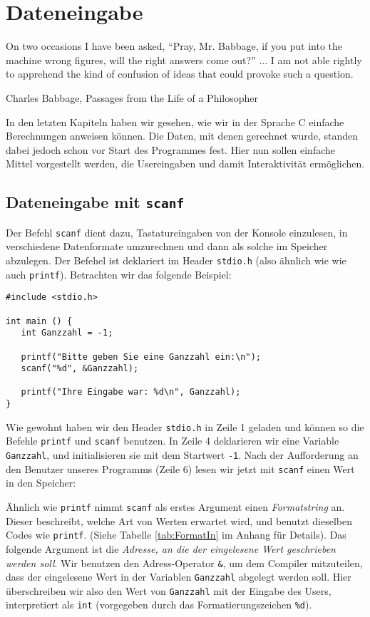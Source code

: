 \chapter{Dateneingabe} \label{chp:Input}
\epigraph{On two occasions I have been asked, \enquote{Pray, Mr. Babbage, if you put into the machine wrong figures, will the right answers come out?} ... I am not able rightly to apprehend the kind of confusion of ideas that could provoke such a question.}{Charles Babbage, Passages from the Life of a Philosopher}

In den letzten Kapiteln haben wir gesehen, wie wir in der Sprache C einfache Berechnungen anweisen können. Die Daten, mit denen gerechnet wurde, standen dabei jedoch schon vor Start des Programmes fest. Hier nun sollen einfache Mittel vorgestellt werden, die Usereingaben und damit Interaktivität ermöglichen.

\section{Dateneingabe mit \texttt{scanf}}
Der Befehl \texttt{scanf} dient dazu, Tastatureingaben von der Konsole einzulesen, in verschiedene Datenformate umzurechnen und dann als solche im Speicher abzulegen. Der Befehel ist deklariert im Header \texttt{stdio.h} (also ähnlich wie wie auch \texttt{printf}). Betrachten wir das folgende Beispiel:

\begin{codebox}
\begin{verbatim}
#include <stdio.h>

int main () {
   int Ganzzahl = -1;
   
   printf("Bitte geben Sie eine Ganzzahl ein:\n");
   scanf("%d", &Ganzzahl);
   
   printf("Ihre Eingabe war: %d\n", Ganzzahl);
}
\end{verbatim}
\end{codebox}

Wie gewohnt haben wir den Header \texttt{stdio.h} in Zeile 1 geladen und können so die Befehle \texttt{printf} und \texttt{scanf} benutzen. In Zeile 4 deklarieren wir eine Variable \texttt{Ganzzahl}, und initialisieren sie mit dem Startwert \texttt{-1}. Nach der Aufforderung an den Benutzer unseres Programms (Zeile 6) lesen wir jetzt mit \texttt{scanf} einen Wert in den Speicher:

Ähnlich wie \texttt{printf} nimmt \texttt{scanf} als erstes Argument einen \emph{Formatstring} an. Dieser beschreibt, welche Art von Werten erwartet wird, und benutzt dieselben Codes wie \texttt{printf}. (Siehe Tabelle \ref{tab:FormatIn} im Anhang für Details). Das folgende Argument ist die \emph{Adresse, an die der eingelesene Wert geschrieben werden soll}. Wir benutzen den Adress-Operator \texttt{\&}, um dem Compiler mitzuteilen, dass der eingelesene Wert in der Variablen \texttt{Ganzzahl} abgelegt werden soll. Hier überschreiben wir also den Wert von \texttt{Ganzzahl} mit der Eingabe des Users, interpretiert als \texttt{int} (vorgegeben durch das Formatierungszeichen \texttt{\%d}).

